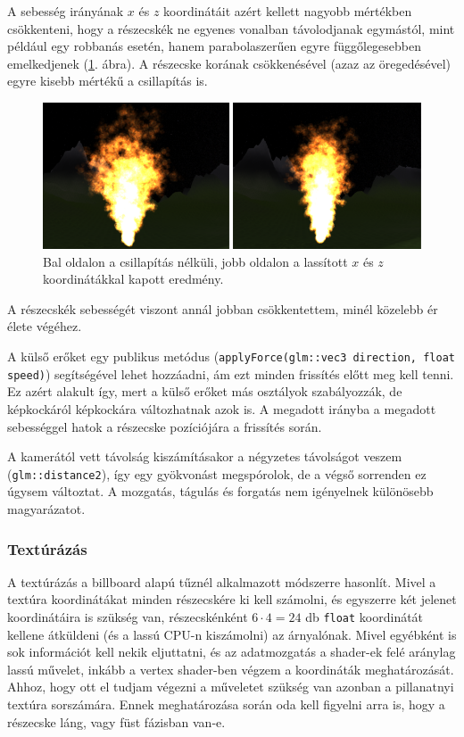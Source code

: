 A sebesség irányának $x$ és $z$ koordinátáit azért kellett nagyobb mértékben csökkenteni, hogy a részecskék ne egyenes vonalban távolodjanak egymástól, mint például egy robbanás esetén, hanem parabolaszerűen egyre függőlegesebben emelkedjenek (\ref{fig:parabolicSpeedVector}. ábra). A részecske korának csökkenésével (azaz az öregedésével) egyre kisebb mértékű a csillapítás is.
\begin{figure}[h]
 \centering
 \includegraphics[width=\textwidth]{kepek/parabolicSpeedVector.png}
 \caption{Bal oldalon a csillapítás nélküli, jobb oldalon a lassított $x$ és $z$ koordinátákkal kapott eredmény.}
 \label{fig:parabolicSpeedVector}
\end{figure}
A részecskék sebességét viszont annál jobban csökkentettem, minél közelebb ér élete végéhez. 

A külső erőket egy publikus metódus (\texttt{applyForce(glm::vec3 direction, float speed)}) segítségével lehet hozzáadni, ám ezt minden frissítés előtt meg kell tenni. Ez azért alakult így, mert a külső erőket más osztályok szabályozzák, de képkockáról képkockára változhatnak azok is. A megadott irányba a megadott sebességgel hatok a részecske pozíciójára a frissítés során.

A kamerától vett távolság kiszámításakor a négyzetes távolságot veszem (\texttt{glm::dis\-tance2}), így egy gyökvonást megspórolok, de a végső sorrenden ez úgysem változtat. A mozgatás, tágulás és forgatás nem igényelnek különösebb magyarázatot.

\subsubsection{Textúrázás}
A textúrázás a billboard alapú tűznél alkalmazott módszerre hasonlít. Mivel a textúra koordinátákat minden részecskére ki kell számolni, és egyszerre két jelenet koordinátáira is szükség van, részecskénként $6 \cdot 4 = 24$ db \texttt{float} koordinátát kellene átküldeni (és a lassú CPU-n kiszámolni) az árnyalónak. Mivel egyébként is sok információt kell nekik eljuttatni, és az adatmozgatás a shader-ek felé aránylag lassú művelet, inkább a vertex shader-ben végzem a koordináták meghatározását. Ahhoz, hogy ott el tudjam végezni a műveletet szükség van azonban a pillanatnyi textúra sorszámára. Ennek meghatározása során oda kell figyelni arra is, hogy a részecske láng, vagy füst fázisban van-e.


